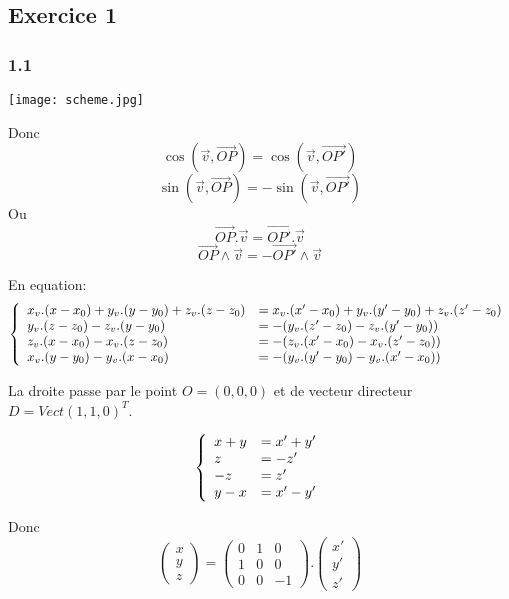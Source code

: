 \documentclass[]{book}
\theoremstyle{definition}
\begin{document}
\subsection*{Exercice 1}
\subsubsection*{1.1}

\texttt{[image: scheme.jpg]}

Donc 
$$ \cos(\overrightarrow{v}, \overrightarrow{OP}) = \cos(\overrightarrow{v}, \overrightarrow{OP'})$$
$$ \sin(\overrightarrow{v}, \overrightarrow{OP}) = -\sin(\overrightarrow{v}, \overrightarrow{OP'})$$
Ou
$$ \overrightarrow{OP}.\overrightarrow{v} = \overrightarrow{OP'}.\overrightarrow{v} $$
$$ \overrightarrow{OP} \land \overrightarrow{v} = -\overrightarrow{OP'} \land \overrightarrow{v} $$

En equation:
$$
\left\{
\begin{array}{l l}
x_v.(x-x_0) + y_v.(y-y_0) + z_v.(z-z_0) & =  x_v.(x'-x_0) + y_v.(y'-y_0) + z_v.(z'-z_0) \\
y_v.(z-z_0) - z_v.(y-y_0) & =  -(y_v.(z'-z_0) - z_v.(y'-y_0)) \\
z_v.(x-x_0) - x_v.(z-z_0) & =  -(z_v.(x'-x_0) - x_v.(z'-z_0)) \\
x_v.(y-y_0) - y_v.(x-x_0) & =  -(y_v.(y'-y_0) - y_v.(x'-x_0)) \\
\end{array}
\right.
$$

La droite passe par le point $O = (0,0,0)$ et de vecteur directeur $D = Vect{(1,1,0)^T}$.

$$
\left\{
\begin{array}{l l}
x + y  & =  x' + y' \\
z & =  -z' \\
- z & =  z' \\
y - x & =  x' - y' \\
\end{array}
\right.
$$

Donc
$$
\begin{pmatrix} x \\ y \\ z \end{pmatrix} = \begin{pmatrix} 0 & 1 & 0 \\ 1 & 0 & 0 \\ 0 & 0 & -1 \end{pmatrix}.\begin{pmatrix} x' \\ y' \\ z' \end{pmatrix}
$$
\end{document}
